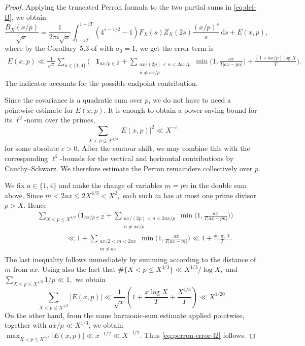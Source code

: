 \documentclass[a4paper,12pt,reqno]{amsart}
\numberwithin{equation}{section}
\theoremstyle{remark}
\begin{document}
\begin{proof}
Applying the truncated Perron formula
\cite[Theorem~5.2 and Corollary~5.3]{MontgomeryVaughan2007}
to the two partial sums in \eqref{eq:def-B}, we obtain
\[
 \frac{B_X(x/p)}{\sqrt x}
 =\frac1{2\pi i\sqrt x}
 \int_{1-iT}^{1+iT}
 \left(4^{s-1/2}-1\right)F_X(s)Z_X(2s)
 \frac{(x/p)^s}{s}\,\mathrm{d}s+E(x,p),
\]
where by the Corollary~5.3 of \cite{MontgomeryVaughan2007} with
$\sigma_0=1$, we get the error term is
\begin{align}
 E(x,p)\ll\frac1{\sqrt x}\sum_{a\in\{1,4\}}
 \Bigg(&
 \mathbf 1_{ax/p\in\mathbb Z}
 +\sum_{\substack{ax/(2p)<n<2ax/p\\ n\ne ax/p}}
 \min\bigg(1,\frac{ax}{T|ax-pn|}\bigg)
 +\frac{(1+ax/p)\log X}{T}
 \Bigg).
 \label{eq:perron-remainder}
\end{align}
The indicator accounts for the possible endpoint contribution.

Since the covariance is a quadratic sum over $p$, we do not have to need a 
pointwise estimate for $E(x,p)$. It is enough to obtain a power-saving
bound for its $\ell^2$-norm over the primes,
\begin{equation}\label{eq:perron-error-l2}
 \sum_{X<p\leq X^{4/3}}|E(x,p)|^2\ll X^{-c}
\end{equation}
for some absolute $c>0$. After the contour shift, we may combine this
with the corresponding $\ell^2$-bounds for the vertical and horizontal
contributions by Cauchy--Schwarz. We therefore estimate the
Perron remainders collectively over $p$. %

We fix $a\in\{1,4\}$ and make the change of variables $m=pn$
in the double sum above. Since
\(
 m<2ax\leq2X^{4/3}<X^2,
\)
each such $m$ has at most one prime divisor $p>X$. Hence
\begin{align*}
 &\sum_{X<p\leq X^{4/3}}
 \Bigg(
 \mathbf 1_{ax/p\in\mathbb Z}
 +\sum_{\substack{ax/(2p)<n<2ax/p\\ n\ne ax/p}}
 \min\bigg(1,\frac{ax}{T|ax-pn|}\bigg)
 \Bigg)\\
 &\qquad\qquad\ll
 1+\sum_{\substack{ax/2<m<2ax\\m\ne ax}}
 \min\bigg(1,\frac{ax}{T|ax-m|}\bigg)
 \ll 1+\frac{x\log X}{T}.
\end{align*}
The last inequality follows immediately by summing according to the distance
of $m$ from $ax$.
Using also the fact that
\(
 \#\{X<p\leq X^{4/3}\}\ll{X^{4/3}}/{\log X},
\) and \(
 \sum_{X<p\leq X^{4/3}}1/p\ll1,
\)
we obtain
\[
 \sum_{X<p\leq X^{4/3}}|E(x,p)|
 \ll
 \frac1{\sqrt x}
 \left(1+\frac{x\log X}{T}+\frac{X^{4/3}}{T}\right)
 \ll X^{1/20}.
\]
On the other hand, from the same harmonic-sum estimate applied pointwise,
together with $ax/p\ll X^{1/3}$, we obtain
\(
 \max_{X<p\leq X^{4/3}}|E(x,p)|
 \ll x^{-1/2}\ll X^{-1/2}.
\)
Thus \eqref{eq:perron-error-l2} follows.


\end{proof}
\end{document}
